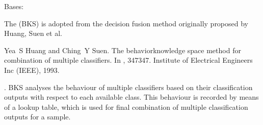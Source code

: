 \documentclass[letterpaper,10pt,english]{sphinxmanual}
\begin{document}
\begin{fulllineitems}
\label{\detokenize{pusion.core.behaviour_knowledge_space_combiner:pusion.core.behaviour_knowledge_space_combiner.BehaviourKnowledgeSpaceCombiner}}
\sphinxAtStartPar
Bases: {\hyperref[\detokenize{pusion.core.combiner:pusion.core.combiner.TrainableCombiner}]{}}

\sphinxAtStartPar
The {\hyperref[\detokenize{pusion.core.behaviour_knowledge_space_combiner:pusion.core.behaviour_knowledge_space_combiner.BehaviourKnowledgeSpaceCombiner}]{}} (BKS) is adopted from the decision fusion method originally proposed by
Huang, Suen et al. %
\begin{footnote}[1]\sphinxAtStartFootnote
Yea S Huang and Ching Y Suen. The behavior\sphinxhyphen{}knowledge space method for combination of multiple classifiers. In , 347\textendash{}347. Institute of Electrical Engineers Inc (IEEE), 1993.
%
\end{footnote}. BKS analyses the behaviour of multiple classifiers based on their
classification outputs with respect to each available class.
This behaviour is recorded by means of a lookup table, which is used for final combination of multiple
classification outputs for a sample.

\sphinxAtStartPar



\end{fulllineitems}
\end{document}

